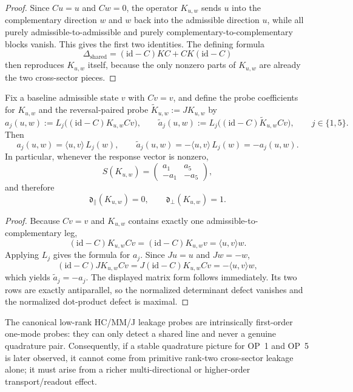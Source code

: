 \begin{proof}
Since $Cu=u$ and $Cw=0$, the operator $K_{u,w}$ sends $u$ into the complementary direction $w$ and $w$ back into the admissible direction $u$, while all purely admissible-to-admissible and purely complementary-to-complementary blocks vanish. This gives the first two identities. The defining formula
\[
 \Delta_{\mathrm{shared}}=(\mathrm{id}-C)KC + CK(\mathrm{id}-C)
\]
then reproduces $K_{u,w}$ itself, because the only nonzero parts of $K_{u,w}$ are already the two cross-sector pieces.
\end{proof}

\begin{proposition}
\label{prop:working-response-geometry-canonical-low-rank-class}
Fix a baseline admissible state $v$ with $Cv=v$, and define the probe coefficients for $K_{u,w}$ and the reversal-paired probe $\widetilde K_{u,w}:=JK_{u,w}$ by
\[
 a_j(u,w):=L_j\bigl((\mathrm{id}-C)K_{u,w}Cv\bigr),
 \qquad
 \widetilde a_j(u,w):=L_j\bigl((\mathrm{id}-C)\widetilde K_{u,w}Cv\bigr),
 \qquad j\in\{1,5\}.
\]
Then
\[
 a_j(u,w)=\langle u,v\rangle\,L_j(w),
 \qquad
 \widetilde a_j(u,w)=-\langle u,v\rangle\,L_j(w)=-a_j(u,w).
\]
In particular, whenever the response vector is nonzero,
\[
 S(K_{u,w})=
 \begin{pmatrix}
 a_1 & a_5\\
 -a_1 & -a_5
 \end{pmatrix},
\]
and therefore
\[
 \mathfrak d_{\parallel}(K_{u,w})=0,
 \qquad
 \mathfrak d_{\perp}(K_{u,w})=1.
\]
\end{proposition}

\begin{proof}
Because $Cv=v$ and $K_{u,w}$ contains exactly one admissible-to-complementary leg,
\[
 (\mathrm{id}-C)K_{u,w}Cv
 =
 (\mathrm{id}-C)K_{u,w}v
 =
 \langle u,v\rangle w.
\]
Applying $L_j$ gives the formula for $a_j$. Since $Ju=u$ and $Jw=-w$,
\[
 (\mathrm{id}-C)JK_{u,w}Cv
 =
 J(\mathrm{id}-C)K_{u,w}Cv
 =
 -\langle u,v\rangle w,
\]
which yields $\widetilde a_j=-a_j$. The displayed matrix form follows immediately. Its two rows are exactly antiparallel, so the normalized determinant defect vanishes and the normalized dot-product defect is maximal.
\end{proof}

\begin{corollary}
\label{cor:working-first-verdict-canonical-probe-class}
The canonical low-rank HC/MM/J leakage probes are intrinsically first-order one-mode probes: they can only detect a shared line and never a genuine quadrature pair. Consequently, if a stable quadrature picture for OP~1 and OP~5 is later observed, it cannot come from primitive rank-two cross-sector leakage alone; it must arise from a richer multi-directional or higher-order transport/readout effect.
\end{corollary}

